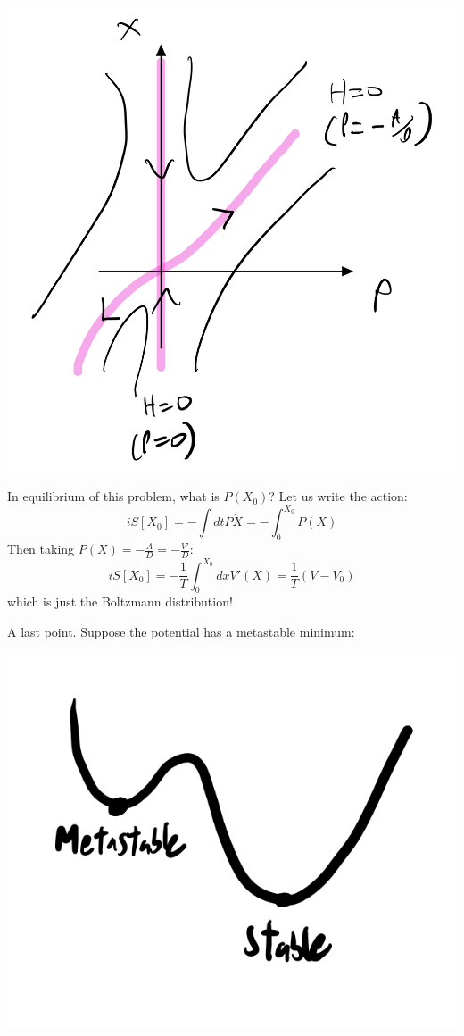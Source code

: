 \begin{center}
    \includegraphics[scale=0.3]{Lectures/Figures/lec16-phasespace.png}
\end{center}

In equilibrium of this problem, what is $P(X_0)$? Let us write the action:
\begin{equation}
    iS[X_0] = - \int dt P\dot{X} = -\int_0^{X_0}P(X)
\end{equation}
Then taking $P(X) = -\frac{A}{D} = -\frac{V'}{D}$:
\begin{equation}
    iS[X_0] = -\frac{1}{T}\int_0^{X_0}dx V'(X) = \frac{1}{T}(V - V_0)
\end{equation}
which is just the Boltzmann distribution!

A last point. Suppose the potential has a metastable minimum:

\begin{center}
    \includegraphics[scale=0.4]{Lectures/Figures/lec16-metastableminima.png}
\end{center}

